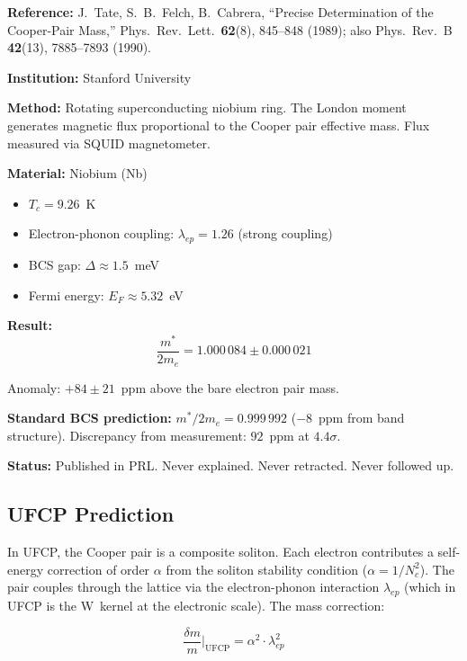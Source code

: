 \documentclass[11pt, a4paper]{article}
\begin{document}
\textbf{Reference:} J.~Tate, S.~B.~Felch, B.~Cabrera,
``Precise Determination of the Cooper-Pair Mass,''
Phys.\ Rev.\ Lett.\ \textbf{62}(8), 845--848 (1989);
also Phys.\ Rev.\ B \textbf{42}(13), 7885--7893 (1990).

\textbf{Institution:} Stanford University

\textbf{Method:} Rotating superconducting niobium ring. The London
moment generates magnetic flux proportional to the Cooper pair
effective mass. Flux measured via SQUID magnetometer.

\textbf{Material:} Niobium (Nb)
\begin{itemize}[nosep]
  \item $T_c = 9.26$~K
  \item Electron-phonon coupling: $\lambda_{ep} = 1.26$ (strong coupling)
  \item BCS gap: $\Delta \approx 1.5$~meV
  \item Fermi energy: $E_F \approx 5.32$~eV
\end{itemize}

\textbf{Result:}
\begin{equation}
  \frac{m^*}{2m_e} = 1.000\,084 \pm 0.000\,021
\end{equation}

Anomaly: $+84 \pm 21$~ppm above the bare electron pair mass.

\textbf{Standard BCS prediction:} $m^*/2m_e = 0.999\,992$
($-8$~ppm from band structure). Discrepancy from measurement:
$92$~ppm at $4.4\sigma$.

\textbf{Status:} Published in PRL. Never explained. Never
retracted. Never followed up.

\subsection{UFCP Prediction}

In UFCP, the Cooper pair is a composite soliton. Each electron
contributes a self-energy correction of order $\alpha$ from the
soliton stability condition ($\alpha = 1/N_c^2$). The pair
couples through the lattice via the electron-phonon interaction
$\lambda_{ep}$ (which in UFCP is the W~kernel at the electronic
scale). The mass correction:

\begin{equation}
  \boxed{
  \frac{\delta m}{m}\bigg|_{\text{UFCP}} = \alpha^2 \cdot \lambda_{ep}^2
  }
  \label{eq:tate}
\end{equation}
\end{document}
